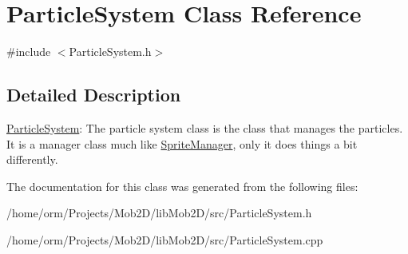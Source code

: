 \hypertarget{classParticleSystem}{
\section{ParticleSystem Class Reference}
\label{classParticleSystem}
}


{\ttfamily \#include $<$ParticleSystem.h$>$}

\subsection{Detailed Description}
\hyperlink{classParticleSystem}{ParticleSystem}: The particle system class is the class that manages the particles. It is a manager class much like \hyperlink{classSpriteManager}{SpriteManager}, only it does things a bit differently. 

The documentation for this class was generated from the following files:\begin{DoxyCompactItemize}
\item 
/home/orm/Projects/Mob2D/libMob2D/src/ParticleSystem.h\item 
/home/orm/Projects/Mob2D/libMob2D/src/ParticleSystem.cpp\end{DoxyCompactItemize}
